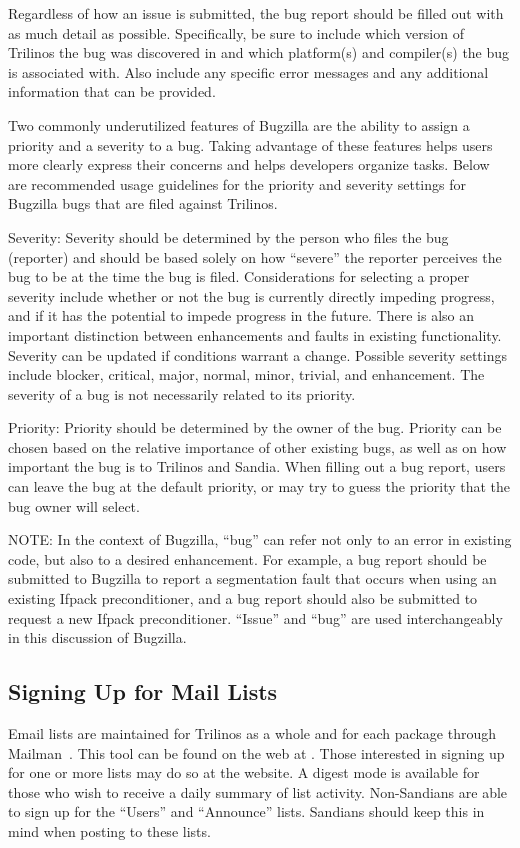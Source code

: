 \documentclass[12pt,relax]{TrilinosUserGuide}
\begin{document}
Regardless of how an issue is submitted, the bug report should be filled out
with as much detail as possible.  Specifically, be sure to include which
version of Trilinos the bug was discovered in and which
platform(s) and compiler(s) the bug is associated with.  Also include any
specific error messages and any additional information that can be provided.

Two commonly underutilized features of Bugzilla are the ability to assign a
priority and a severity to a bug.  Taking advantage of these features helps
users more clearly express their concerns and helps developers organize tasks.
Below are recommended usage guidelines for the priority and severity settings
for Bugzilla bugs that are filed against Trilinos.

Severity: Severity should be determined by the person who files the bug
(reporter) and should be based solely on how “severe” the reporter perceives
the bug to be at the time the bug is filed.  Considerations for selecting a
proper severity include whether or not the bug is currently directly impeding
progress, and if it has the potential to impede progress in the future.  There
is also an important distinction between enhancements and faults in existing
functionality.  Severity can be updated if conditions warrant a change.
Possible severity settings include blocker, critical, major, normal, minor,
trivial, and enhancement.  The severity of a bug is not necessarily related to
its priority.

Priority: Priority should be determined by the owner of the bug.  Priority can
be chosen based on the relative importance of other existing bugs, as well as
on how important the bug is to Trilinos and Sandia.  When filling out a bug
report, users can leave the bug at the default priority, or may try to guess
the priority that the bug owner will select.

NOTE: In the context of Bugzilla, ``bug'' can refer not only to an error in
existing code, but also to a desired enhancement.  For example, a bug report
should be submitted to Bugzilla to report a segmentation fault that occurs
when using an existing Ifpack preconditioner, and a bug report should also be
submitted to request a new Ifpack preconditioner.  ``Issue'' and ``bug'' are
used interchangeably in this discussion of Bugzilla.

\subsection{Signing Up for Mail Lists}
\label{subsect:MailMan}
Email lists are maintained for Trilinos as a whole and for each package
through Mailman~\cite{Mailman}.  This tool can be found on the web at
\newline
{}.
Those interested in signing
up for one or more lists may do so at the website.  A digest mode is
available for those who wish to receive a daily summary of list activity.
Non-Sandians are able to sign up for the ``Users'' and ``Announce''
lists.  Sandians should keep this in mind when posting to these lists.
\end{document}
